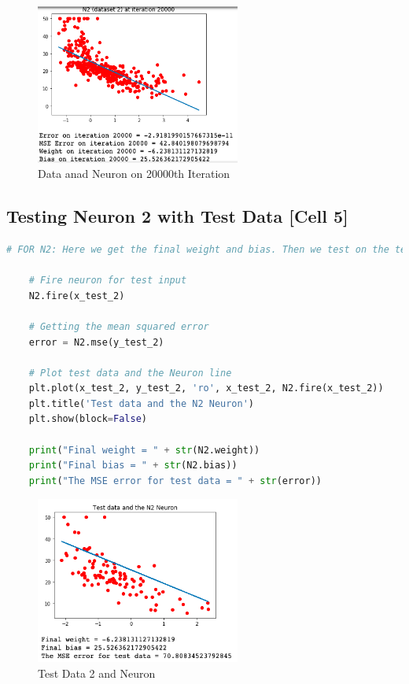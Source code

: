 \documentclass[a4paper, 12pt]{article}
\begin{document}
    \begin{figure}[h!]
        \centering
        \captionsetup{justification=centering}
        \centering
            \includegraphics[width=0.6\textwidth]{5.png}
            \caption{Data anad Neuron on 20000th Iteration}
    \end{figure}

    \pagebreak

    \subsection{Testing Neuron 2 with Test Data [Cell 5]}

    \begin{lstlisting}[language=python, caption=Dataset 2 Testing Code (Cell 5)]
    # FOR N2: Here we get the final weight and bias. Then we test on the test data

    # Fire neuron for test input
    N2.fire(x_test_2)

    # Getting the mean squared error 
    error = N2.mse(y_test_2)

    # Plot test data and the Neuron line
    plt.plot(x_test_2, y_test_2, 'ro', x_test_2, N2.fire(x_test_2))
    plt.title('Test data and the N2 Neuron')
    plt.show(block=False)

    print("Final weight = " + str(N2.weight))
    print("Final bias = " + str(N2.bias))
    print("The MSE error for test data = " + str(error))\end{lstlisting}

    \begin{figure}[h!]
        \centering
        \captionsetup{justification=centering}
        \centering
            \includegraphics[width=0.6\textwidth]{6.png}
            \caption{Test Data 2 and Neuron}
    \end{figure}
\end{document}
